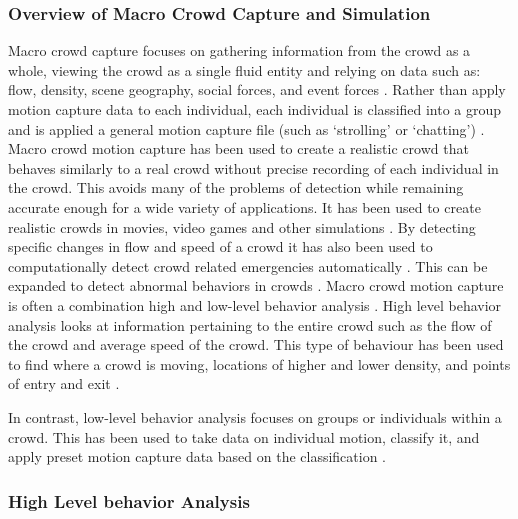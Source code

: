 \documentclass[12pt, onecolumn, conference]{IEEEtran}
\begin{document}
\subsubsection{Overview of Macro Crowd Capture and Simulation}

Macro crowd capture focuses on gathering information from the crowd as a whole, viewing the crowd as a single fluid entity and relying on data such as: flow, density, scene geography, social forces, and event forces \cite{N. Courty}\cite{B. Boghossian}\cite{R. Mehran}\cite{S. Saxena}. Rather than apply motion capture data to each individual, each individual is classified into a group and is applied a general motion capture file (such as ‘strolling’ or ‘chatting’) \cite{K. Lee}. Macro crowd motion capture has been used to create a realistic crowd that behaves similarly to a real crowd without precise recording of each individual in the crowd. This avoids many of the problems of detection while remaining accurate enough for a wide variety of applications. It has been used to create realistic crowds in movies, video games and other simulations \cite{N. Courty}\cite{R. Mehran}. By detecting specific changes in flow and speed of a crowd it has also been used to computationally detect crowd related emergencies automatically \cite{B. Boghossian}. This can be expanded to detect abnormal behaviors in crowds \cite{S. Saxena}.
Macro crowd motion capture is often a combination high and low-level behavior analysis \cite{K. Lee}. High level behavior analysis looks at information pertaining to the entire crowd such as the flow of the crowd and average speed of the crowd. This type of behaviour has been used to find where a crowd is moving, locations of higher and lower density, and points of entry and exit \cite{N. Courty}\cite{B. Boghossian}\cite{R. Mehran}\cite{M. Rodriguez}.

In contrast, low-level behavior analysis focuses on groups or individuals within a crowd. This has been used to take data on individual motion, classify it, and apply preset motion capture data based on the classification \cite{K. Lee}\cite{S. Saxena}. 

\subsubsection{High Level behavior Analysis}
\end{document}
